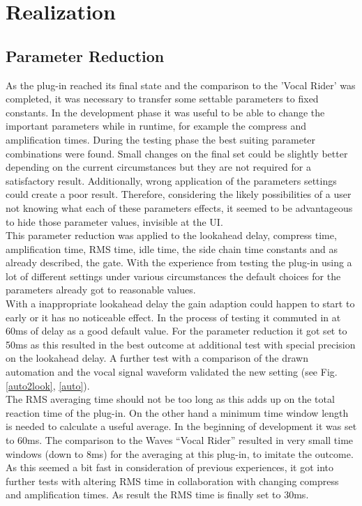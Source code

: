 \chapter{Realization}
\label{chapter:realization}

\section{Parameter Reduction}

As the plug-in reached its final state and the comparison to the 'Vocal Rider' was completed, it was necessary to transfer some settable parameters to fixed constants. In the development phase it was useful to be able to change the important parameters while in runtime, for example the compress and amplification times. During the testing phase the best suiting parameter combinations were found. Small changes on the final set could be slightly better depending on the current circumstances but they are not required for a satisfactory result. Additionally, wrong application of the parameters settings could create a poor result. Therefore, considering the likely possibilities of a user not knowing what each of these parameters effects, it seemed to be advantageous to hide those parameter values, invisible at the UI.\\
This parameter reduction was applied to the lookahead delay, compress time, amplification time, RMS time, idle time, the side chain time constants and as already described, the gate. With the experience from testing the plug-in using a lot of different settings under various circumstances the default choices for the parameters already got to reasonable values.\\
With a inappropriate lookahead delay the gain adaption could happen to start to early or it has no noticeable effect. In the process of testing it commuted in at 60ms of delay as a good default value. For the parameter reduction it got set to 50ms as this resulted in the best outcome at additional test with special precision on the lookahead delay. A further test with a comparison of the drawn automation and the vocal signal waveform validated the new setting (see Fig. \ref{auto2look}, \ref{auto}).\\
The RMS averaging time should not be too long as this adds up on the total reaction time of the plug-in. On the other hand a minimum time window length is needed to calculate a useful average. In the beginning of development it was set to 60ms. The comparison to the Waves “Vocal Rider” resulted in very small time windows (down to 8ms) for the averaging at this plug-in, to imitate the outcome. As this seemed a bit fast in consideration of previous experiences, it got into further tests with altering RMS time in collaboration with changing compress and amplification times. As result the RMS time is finally set to 30ms.\\
